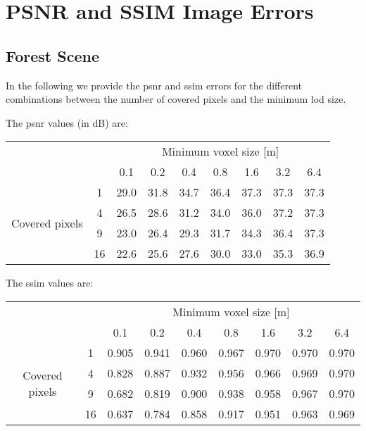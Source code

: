 
\chapter{PSNR and SSIM Image Errors}
\label{chap:psnr_and_ssim_errors}

\section{Forest Scene}
In the following we provide the \ac{psnr} and \ac{ssim} errors for the different combinations between the number of covered pixels and the minimum \ac{lod} size.

The \ac{psnr} values (in dB) are:
\begin{center}
    \begin{tabular}{| c | c | c | c | c | c | c | c | c |}
        \cline{3-9}
        \multicolumn{2}{c|}{} & \multicolumn{7}{c|}{Minimum voxel size [m]} \\
        \cline{3-9}
        \multicolumn{2}{c|}{} & 0.1 & 0.2 & 0.4 & 0.8 & 1.6 & 3.2 & 6.4 \\
        \hline
        \multirow{4}{*}{Covered pixels}& 1 & 29.0 & 31.8 & 34.7 & 36.4 & 37.3 & 37.3 & 37.3 \\
        \cline{2-9}
        & 4 & 26.5 & 28.6 & 31.2 & 34.0 & 36.0 & 37.2 & 37.3 \\
        \cline{2-9}
        & 9 & 23.0 & 26.4 & 29.3 & 31.7 & 34.3 & 36.4 & 37.3 \\
        \cline{2-9}
        & 16 & 22.6 & 25.6 & 27.6 & 30.0 & 33.0 & 35.3 & 36.9 \\
        \hline
    \end{tabular}
\end{center}

The \ac{ssim} values are:
\begin{center}
    \begin{tabular}{| c | c | c | c | c | c | c | c | c |}
        \cline{3-9}
        \multicolumn{2}{c|}{} & \multicolumn{7}{c|}{Minimum voxel size [m]} \\
        \cline{3-9}
        \multicolumn{2}{c|}{} & 0.1 & 0.2 & 0.4 & 0.8 & 1.6 & 3.2 & 6.4 \\
        \hline
        \multirow{4}{*}{Covered pixels}& 1 & 0.905 & 0.941 & 0.960 & 0.967 & 0.970 & 0.970 & 0.970 \\
        \cline{2-9}
        & 4 & 0.828 & 0.887 & 0.932 & 0.956 & 0.966 & 0.969 & 0.970 \\
        \cline{2-9}
        & 9 & 0.682 & 0.819 & 0.900 & 0.938 & 0.958 & 0.967 & 0.970 \\
        \cline{2-9}
        & 16 & 0.637 & 0.784 & 0.858 & 0.917 & 0.951 & 0.963 & 0.969 \\
        \hline
    \end{tabular}
\end{center}

